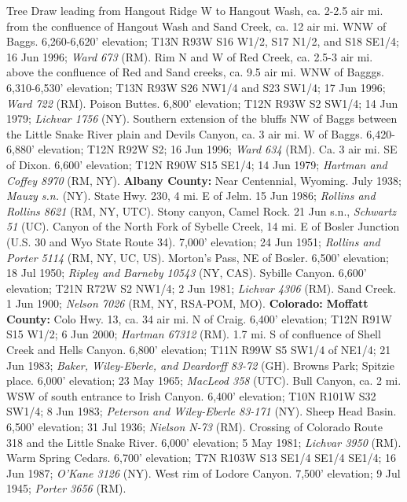Tree Draw leading from Hangout Ridge W to Hangout Wash, ca.
2-2.5 air mi. from the confluence of Hangout Wash and Sand Creek, ca. 12 air mi.
WNW of Baggs. 6,260-6,620’ elevation; T13N R93W S16 W1/2, S17 N1/2, and
S18 SE1/4; 16 Jun 1996; \textit{Ward 673} (RM).
Rim N and W of Red Creek, ca. 2.5-3 air mi. above the confluence
of Red and Sand creeks, ca. 9.5 air mi. WNW of Bagggs. 6,310-6,530’ elevation;
T13N R93W S26 NW1/4 and S23 SW1/4; 17 Jun 1996; \textit{Ward 722} (RM).
Poison Buttes. 6,800’ elevation; T12N R93W S2 SW1/4; 14 Jun 1979;
\textit{Lichvar 1756} (NY).
Southern extension of the bluffs NW of Baggs between the Little Snake River
plain and Devils Canyon, ca. 3 air mi. W of Baggs. 6,420-6,880’ elevation;
T12N R92W S2; 16 Jun 1996; \textit{Ward 634} (RM).
Ca. 3 air mi. SE of Dixon. 6,600’ elevation; T12N R90W S15 SE1/4; 14 Jun 1979;
\textit{Hartman and Coffey 8970} (RM, NY).
  \textbf{Albany County:}
Near Centennial, Wyoming. July 1938; \textit{Mauzy s.n.} (NY).
State Hwy. 230, 4 mi. E of Jelm. 15 Jun 1986;
\textit{Rollins and Rollins 8621} (RM, NY, UTC).
Stony canyon, Camel Rock. 21 Jun s.n., \textit{Schwartz 51} (UC).
Canyon of the North Fork of Sybelle Creek, 14 mi. E of Bosler Junction (U.S. 30
and Wyo State Route 34). 7,000’ elevation; 24 Jun 1951;
\textit{Rollins and Porter 5114} (RM, NY, UC, US).
Morton’s Pass, NE of Bosler. 6,500’ elevation; 18 Jul 1950;
\textit{Ripley and Barneby 10543} (NY, CAS).
Sybille Canyon. 6,600’ elevation; T21N R72W S2 NW1/4; 2 Jun 1981;
\textit{Lichvar 4306} (RM).
Sand Creek. 1 Jun 1900; \textit{Nelson 7026} (RM, NY, RSA-POM, MO).
  \textbf{Colorado:}
  \textbf{Moffatt County:}
Colo Hwy. 13, ca. 34 air mi. N of Craig. 6,400' elevation; T12N R91W S15 W1/2;
6 Jun 2000; \textit{Hartman 67312} (RM).
1.7 mi. S of confluence of Shell Creek and Hells Canyon. 6,800' elevation;
T11N R99W S5 SW1/4 of NE1/4; 21 Jun 1983;
\textit{Baker, Wiley-Eberle, and Deardorff 83-72} (GH).
Browns Park; Spitzie place. 6,000' elevation; 23 May 1965;
\textit{MacLeod 358} (UTC).
Bull Canyon, ca. 2 mi. WSW of south entrance to Irish Canyon. 6,400' elevation;
T10N R101W S32 SW1/4; 8 Jun 1983; \textit{Peterson and Wiley-Eberle 83-171} (NY).
Sheep Head Basin. 6,500' elevation; 31 Jul 1936; \textit{Nielson N-73} (RM).
Crossing of Colorado Route 318 and the Little Snake River. 6,000' elevation;
5 May 1981; \textit{Lichvar 3950} (RM).
Warm Spring Cedars. 6,700' elevation; T7N R103W S13 SE1/4 SE1/4 SE1/4;
16 Jun 1987; \textit{O'Kane 3126} (NY).
West rim of Lodore Canyon. 7,500' elevation; 9 Jul 1945;
\textit{Porter 3656} (RM).
